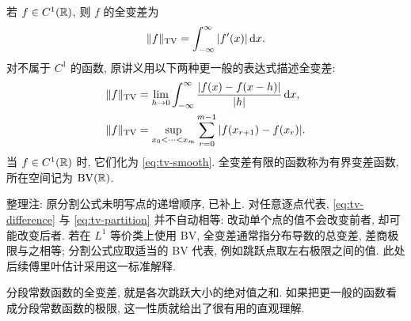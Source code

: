 \begin{definition}[全变差]
若 $f\in C^1(\mathbb R)$, 则 $f$ 的全变差为
\begin{equation}\label{eq:tv-smooth}
\lVert f\rVert_{\operatorname{TV}}=\int_{-\infty}^{\infty}|f'(x)|\,\mathrm d x.
\end{equation}
对不属于 $C^1$ 的函数, 原讲义用以下两种更一般的表达式描述全变差:
\begin{align}
\lVert f\rVert_{\operatorname{TV}}
&=\lim_{h\to0}\int_{-\infty}^{\infty}
\frac{|f(x)-f(x-h)|}{|h|}\,\mathrm d x,\label{eq:tv-difference}\\
\lVert f\rVert_{\operatorname{TV}}
&=\sup_{x_0<\cdots<x_m}\sum_{r=0}^{m-1}
|f(x_{r+1})-f(x_r)|.\label{eq:tv-partition}
\end{align}
当 $f\in C^1(\mathbb R)$ 时, 它们化为 \eqref{eq:tv-smooth}. 全变差有限的函数称为有界变差函数, 所在空间记为 $\operatorname{BV}(\mathbb R)$.
\end{definition}
\begin{remark}
整理注: 原分割公式未明写点的递增顺序, 已补上. 对任意逐点代表, \eqref{eq:tv-difference} 与 \eqref{eq:tv-partition} 并不自动相等: 改动单个点的值不会改变前者, 却可能改变后者. 若在 $L^1$ 等价类上使用 BV, 全变差通常指分布导数的总变差, 差商极限与之相等; 分割公式应取适当的 BV 代表, 例如跳跃点取左右极限之间的值. 此处后续傅里叶估计采用这一标准解释.
\end{remark}

分段常数函数的全变差, 就是各次跳跃大小的绝对值之和. 如果把更一般的函数看成分段常数函数的极限, 这一性质就给出了很有用的直观理解.

